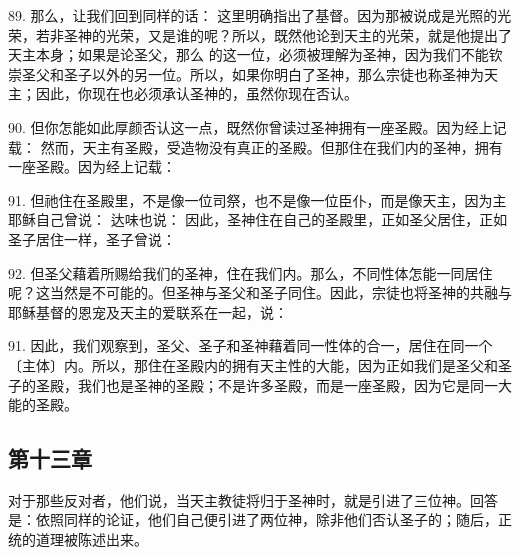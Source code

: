 89. 那么，让我们回到同样的话： 这里明确指出了基督。因为那被说成是光照的光荣，若非圣神的光荣，又是谁的呢？所以，既然他论到天主的光荣，就是他提出了天主本身；如果是论圣父，那么  的这一位，必须被理解为圣神，因为我们不能钦崇圣父和圣子以外的另一位。所以，如果你明白了圣神，那么宗徒也称圣神为天主；因此，你现在也必须承认圣神的，虽然你现在否认。\par

90. 但你怎能如此厚颜否认这一点，既然你曾读过圣神拥有一座圣殿。因为经上记载： 然而，天主有圣殿，受造物没有真正的圣殿。但那住在我们内的圣神，拥有一座圣殿。因为经上记载：\par

91. 但祂住在圣殿里，不是像一位司祭，也不是像一位臣仆，而是像天主，因为主耶稣自己曾说： 达味也说： 因此，圣神住在自己的圣殿里，正如圣父居住，正如圣子居住一样，圣子曾说：\par

92. 但圣父藉着所赐给我们的圣神，住在我们内。那么，不同性体怎能一同居住呢？这当然是不可能的。但圣神与圣父和圣子同住。因此，宗徒也将圣神的共融与耶稣基督的恩宠及天主的爱联系在一起，说：\par

91. 因此，我们观察到，圣父、圣子和圣神藉着同一性体的合一，居住在同一个〔主体〕内。所以，那住在圣殿内的拥有天主性的大能，因为正如我们是圣父和圣子的圣殿，我们也是圣神的圣殿；不是许多圣殿，而是一座圣殿，因为它是同一大能的圣殿。\par


\subsection{第十三章}

对于那些反对者，他们说，当天主教徒将归于圣神时，就是引进了三位神。回答是：依照同样的论证，他们自己便引进了两位神，除非他们否认圣子的；随后，正统的道理被陈述出来。\par

